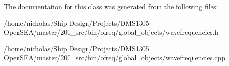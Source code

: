 The documentation for this class was generated from the following files\-:\begin{DoxyCompactItemize}
\item 
/home/nicholas/\-Ship Design/\-Projects/\-D\-M\-S1305 Open\-S\-E\-A/master/200\-\_\-src/bin/ofreq/global\-\_\-objects/wavefrequencies.\-h\item 
/home/nicholas/\-Ship Design/\-Projects/\-D\-M\-S1305 Open\-S\-E\-A/master/200\-\_\-src/bin/ofreq/global\-\_\-objects/wavefrequencies.\-cpp\end{DoxyCompactItemize}
